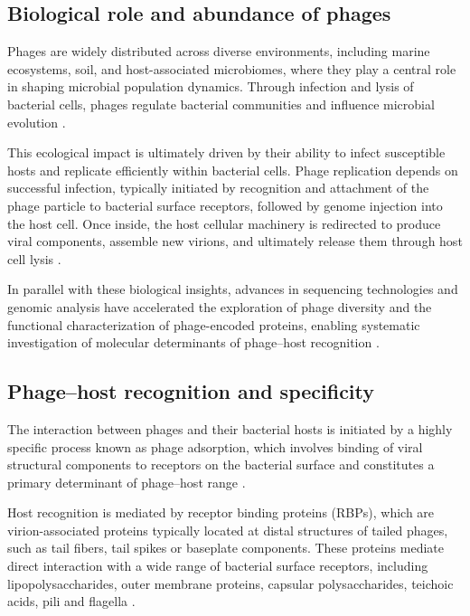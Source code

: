 \documentclass[runningheads]{llncs}
\begin{document}
\subsection{Biological role and abundance of phages}

Phages are widely distributed across diverse environments, including marine ecosystems, soil, and host-associated microbiomes, where they play a central role in shaping microbial population dynamics. Through infection and lysis of bacterial cells, phages regulate bacterial communities and influence microbial evolution \cite{hatfull2015}.

This ecological impact is ultimately driven by their ability to infect susceptible hosts and replicate efficiently within bacterial cells. Phage replication depends on successful infection, typically initiated by recognition and attachment of the phage particle to bacterial surface receptors, followed by genome injection into the host cell. Once inside, the host cellular machinery is redirected to produce viral components, assemble new virions, and ultimately release them through host cell lysis \cite{hatfull2015}.

In parallel with these biological insights, advances in sequencing technologies and genomic analysis have accelerated the exploration of phage diversity and the functional characterization of phage-encoded proteins, enabling systematic investigation of molecular determinants of phage--host recognition \cite{santos2018}.

\subsection{Phage--host recognition and specificity}

The interaction between phages and their bacterial hosts is initiated by a highly specific process known as phage adsorption, which involves binding of viral structural components to receptors on the bacterial surface and constitutes a primary determinant of phage--host range \cite{silva2016}.

Host recognition is mediated by receptor binding proteins (RBPs), which are virion-associated proteins typically located at distal structures of tailed phages, such as tail fibers, tail spikes or baseplate components. These proteins mediate direct interaction with a wide range of bacterial surface receptors, including lipopolysaccharides, outer membrane proteins, capsular polysaccharides, teichoic acids, pili and flagella \cite{silva2016,latka2019,rai2026}.
\end{document}
